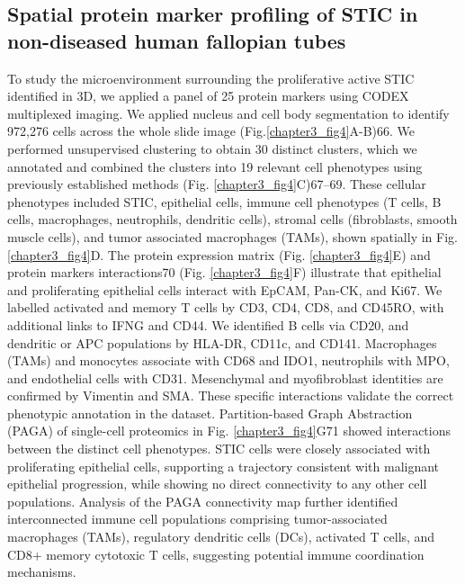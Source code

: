 \begin{refsection}
    \subsection{Spatial protein marker profiling of STIC in non-diseased human fallopian tubes}
    To study the microenvironment surrounding the proliferative active STIC identified in 3D, we applied a panel of 25 protein markers using CODEX multiplexed imaging. We applied nucleus and cell body segmentation to identify 972,276 cells across the whole slide image (Fig.\ref{chapter3_fig4}A-B)66. We performed unsupervised clustering to obtain 30 distinct clusters, which we annotated and combined the clusters into 19 relevant cell phenotypes using previously established methods (Fig. \ref{chapter3_fig4}C)\cite{Squidpy,Wolf2018SCANPY,Virshup2021anndata}67–69. These cellular phenotypes included STIC, epithelial cells, immune cell phenotypes (T cells, B cells, macrophages, neutrophils, dendritic cells), stromal cells (fibroblasts, smooth muscle cells), and tumor associated macrophages (TAMs), shown spatially in Fig. \ref{chapter3_fig4}D. The protein expression matrix (Fig. \ref{chapter3_fig4}E) and protein markers interactions\cite{Krzywinski2009Circos}70 (Fig. \ref{chapter3_fig4}F) illustrate that epithelial and proliferating epithelial cells interact with EpCAM, Pan-CK, and Ki67. We labelled activated and memory T cells by CD3, CD4, CD8, and CD45RO, with additional links to IFNG and CD44. We identified B cells via CD20, and dendritic or APC populations by HLA-DR, CD11c, and CD141. Macrophages (TAMs) and monocytes associate with CD68 and IDO1, neutrophils with MPO, and endothelial cells with CD31. Mesenchymal and myofibroblast identities are confirmed by Vimentin and SMA. These specific interactions validate the correct phenotypic annotation in the dataset.
    Partition-based Graph Abstraction (PAGA) of single-cell proteomics in Fig. \ref{chapter3_fig4}G\cite{Wolf2019PAGA}71 showed interactions between the distinct cell phenotypes. STIC cells were closely associated with proliferating epithelial cells, supporting a trajectory consistent with malignant epithelial progression, while showing no direct connectivity to any other cell populations. Analysis of the PAGA connectivity map further identified interconnected immune cell populations comprising tumor-associated macrophages (TAMs), regulatory dendritic cells (DCs), activated T cells, and CD8+ memory cytotoxic T cells, suggesting potential immune coordination mechanisms. 

\end{refsection}

